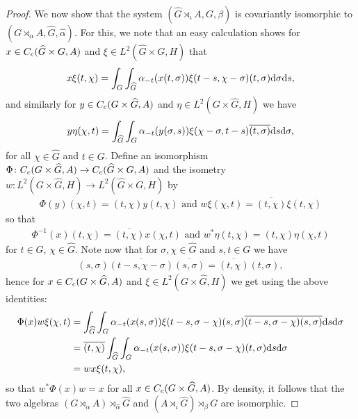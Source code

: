 \begin{proof}
We now show that the system $(\hat G \rtimes_\iota  A , G, \beta)$ is covariantly isomorphic to $(G \rtimes_\alpha A, \hat G, \hat \alpha)$. For this, we note that an easy calculation shows for $x \in C_c(\widehat{G} \times G, A)$ and $\xi \in L^2(\hat G \times G, H)$ that
\begin{align*}
x \xi(t, \chi)=\int_G \int_{\widehat{G}} \alpha_{-t}(x(t, \sigma)) \xi(t-s,\chi-\sigma)(t,\sigma)\mathrm{d} \sigma \mathrm{d} s,	
\end{align*}
and similarly for $y \in C_c(G \times \widehat{G}, A)$ and $\eta \in L^2(G \times \hat G, H)$ we have
\begin{align*}
y \eta(\chi,t) = \int_{\widehat{G}} \int_G \alpha_{-t}(y(\sigma,s)) \xi(\chi-\sigma, t-s) \overline{(t,\sigma)} \mathrm{d} s \mathrm{d} \sigma,
\end{align*}
for all $\chi \in \hat G$ and $t \in G$. Define an isomorphism $\Phi \colon C_c(G \times \widehat{G}, A) \to C_c(\widehat{G}\times G , A)$ and the isometry $w \colon L^2(G \times \hat G, H) \to L^2(\hat G \times G, H)$ by
\begin{align*}
\Phi(y)(\chi,t) = (t,\chi) y(t,\chi) \text{ and } w \xi(\chi,t) = \overline{(t,\chi)} \xi(t,\chi)	
\end{align*}
so that
\begin{align*}
\Phi^{-1}(x)(t,\chi) = \overline{(t,\chi)} x(\chi,t) \text{ and } w^* \eta(t,\chi) = (t,\chi) \eta(\chi,t)	
\end{align*}
for $t \in G$, $\chi \in \hat G$. Note now that for $\sigma, \chi \in \hat G$ and $s,t \in G$ we have
\begin{align*}
(s,\sigma) \overline{(t-s,\chi- \sigma)}\overline{(s,\sigma)} = \overline{(t,\chi)}(t,\sigma),
\end{align*}
hence for $x \in C_c(G \times \widehat{G}, A)$ and $\xi \in L^2(G \times \hat G,H)$ we get using the above identities:
\begin{align*}
\Phi(x) w \xi(\chi,t)&= \int_{\widehat{G}} \int_G \alpha_{-t}(x(s, \sigma)) \xi(t-s, \sigma- \chi)(s, \sigma) \overline{(t-s,\sigma-\chi)}\overline{(s,\sigma)} \mathrm{d} s \mathrm{d} \sigma\\
&= \overline{(t,\chi)} \int_{\widehat{G}} \int_G \alpha_{-t}(x(s,\sigma)) \xi(t-s,\sigma-\chi)(t,\sigma) \mathrm{d} s \mathrm{d} \sigma\\
&= w x \xi(t,\chi),
\end{align*}
so that $w^* \Phi(x) w = x$ for all $x \in C_c(G \times \widehat{G}, A)$. By density, it follows that the two algebras $(G \rtimes_\alpha A) \rtimes_{\hat \alpha} \hat G $ and $(A \rtimes_{\iota} \hat G)\rtimes_{\beta} G$ are isomorphic.
\end{proof}
